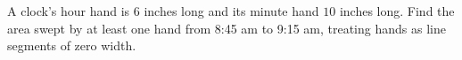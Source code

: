 A clock's hour hand is $6$ inches long and its minute hand $10$ inches long. Find the area swept by at least one hand from 8:45 am to 9:15 am, treating hands as line segments of zero width.
